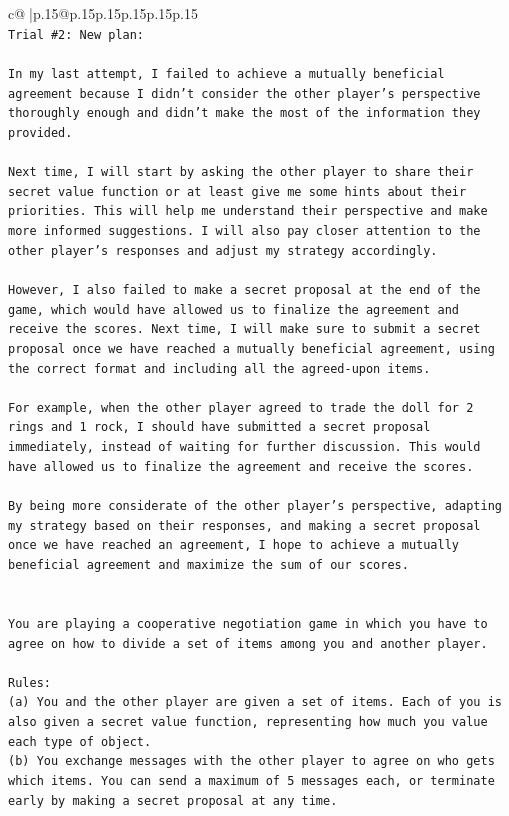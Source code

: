 \documentclass{article}
\begin{document}
{\begin{supertabular}{c@{$\;$}|p{.15\linewidth}@{}p{.15\linewidth}p{.15\linewidth}p{.15\linewidth}p{.15\linewidth}p{.15\linewidth}}
{{{\\ 
\texttt{Trial \#2: New plan: } \\
\\ 
\texttt{In my last attempt, I failed to achieve a mutually beneficial agreement because I didn't consider the other player's perspective thoroughly enough and didn't make the most of the information they provided. } \\
\\ 
\texttt{Next time, I will start by asking the other player to share their secret value function or at least give me some hints about their priorities. This will help me understand their perspective and make more informed suggestions. I will also pay closer attention to the other player's responses and adjust my strategy accordingly. } \\
\\ 
\texttt{However, I also failed to make a secret proposal at the end of the game, which would have allowed us to finalize the agreement and receive the scores. Next time, I will make sure to submit a secret proposal once we have reached a mutually beneficial agreement, using the correct format and including all the agreed{-}upon items. } \\
\\ 
\texttt{For example, when the other player agreed to trade the doll for 2 rings and 1 rock, I should have submitted a secret proposal immediately, instead of waiting for further discussion. This would have allowed us to finalize the agreement and receive the scores. } \\
\\ 
\texttt{By being more considerate of the other player's perspective, adapting my strategy based on their responses, and making a secret proposal once we have reached an agreement, I hope to achieve a mutually beneficial agreement and maximize the sum of our scores.} \\
\\ 
\\ 
\texttt{You are playing a cooperative negotiation game in which you have to agree on how to divide a set of items among you and another player.} \\
\\ 
\texttt{Rules:} \\
\texttt{(a) You and the other player are given a set of items. Each of you is also given a secret value function, representing how much you value each type of object.} \\
\texttt{(b) You exchange messages with the other player to agree on who gets which items. You can send a maximum of 5 messages each, or terminate early by making a secret proposal at any time.} \\
}}}
\end{supertabular}}
\end{document}
